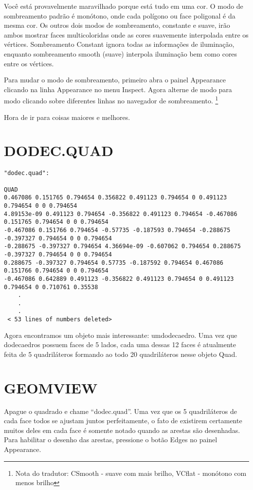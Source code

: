 \documentclass[12pt,a4paper]{book}
\begin{document}
Você está provavelmente maravilhado porque está tudo em uma cor.  O modo de sombreamento
padrão é monótono, onde cada polígono ou face poligonal é da mesma
cor. Os outros dois modos de sombreamento, constante e suave, irão ambos
mostrar faces multicoloridas onde as cores suavemente interpolada
entre os vértices. Sombreamento Constant ignora todas as informações de iluminação,
enquanto sombreamento smooth (suave) interpola iluminação bem como cores entre
os vértices.

Para mudar o modo de sombreamento, primeiro abra o painel Appearance clicando
na linha Appearance no menu Inspect.  Agora alterne de
modo para modo clicando sobre diferentes linhas no navegador de sombreamento.
\footnote{Nota do tradutor: CSmooth - suave com mais brilho, VCflat - monótono com menos brilho}

Hora de ir para coisas maiores e melhores. 

\section{DODEC.QUAD}

\begin{verbatim}
"dodec.quad":

QUAD
0.467086 0.151765 0.794654 0.356822 0.491123 0.794654 0 0.491123 0.794654 0 0 0.794654
4.89153e-09 0.491123 0.794654 -0.356822 0.491123 0.794654 -0.467086 0.151765 0.794654 0 0 0.794654
-0.467086 0.151766 0.794654 -0.57735 -0.187593 0.794654 -0.288675 -0.397327 0.794654 0 0 0.794654
-0.288675 -0.397327 0.794654 4.36694e-09 -0.607062 0.794654 0.288675 -0.397327 0.794654 0 0 0.794654
0.288675 -0.397327 0.794654 0.57735 -0.187592 0.794654 0.467086 0.151766 0.794654 0 0 0.794654
-0.467086 0.642889 0.491123 -0.356822 0.491123 0.794654 0 0.491123 0.794654 0 0.710761 0.35538
	.
	.
	.
 < 53 lines of numbers deleted>
\end{verbatim}

Agora encontramos um objeto mais interessante: umdodecaedro.  Uma vez que
dodecaedros possuem faces de 5 lados, cada uma dessas 12 faces é atualmente feita
de 5 quadriláteros formando ao todo 20 quadriláteros nesse objeto Quad.

\section{GEOMVIEW}

Apague o quadrado e chame ``dodec.quad''. Uma vez que os 5
quadriláteros de cada face todos se ajustam juntos perfeitamente, o fato de
existirem certamente muitos deles em cada face é somente notado quando as
arestas são desenhadas. Para habilitar o desenho das arestas, pressione o botão Edges no
painel Appearance.
\end{document}
